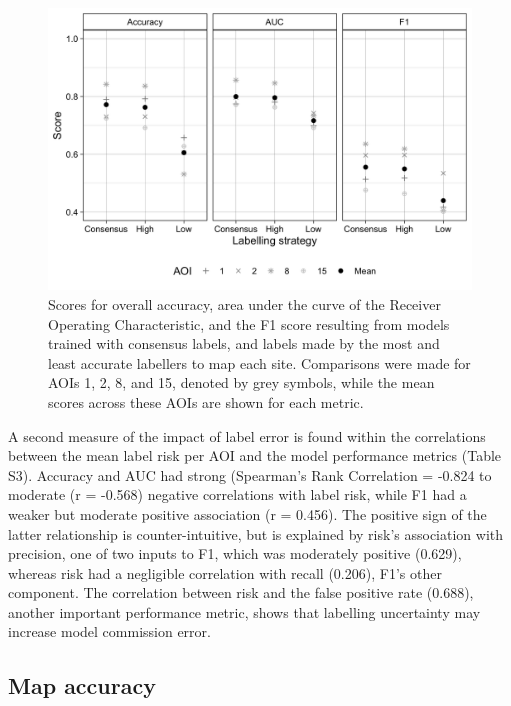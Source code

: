 \documentclass[11pt,a4paper]{article}
\begin{document}
\begin{figure}

{\centering \includegraphics[width=1\linewidth]{figures/figure6} 

}

\caption{Scores for overall accuracy, area under the curve of the Receiver Operating Characteristic, and the F1 score resulting from models trained with consensus labels, and labels made by the most and least accurate labellers to map each site. Comparisons were made for AOIs 1, 2, 8, and 15, denoted by grey symbols, while the mean scores across these AOIs are shown for each metric.}\label{fig:trainingimpact}
\end{figure}

A second measure of the impact of label error is found within the
correlations between the mean label risk per AOI and the model
performance metrics (Table S3). Accuracy and AUC had strong (Spearman's
Rank Correlation = -0.824 to moderate (r = -0.568) negative correlations
with label risk, while F1 had a weaker but moderate positive association
(r = 0.456). The positive sign of the latter relationship is
counter-intuitive, but is explained by risk's association with
precision, one of two inputs to F1, which was moderately positive
(0.629), whereas risk had a negligible correlation with recall (0.206),
F1's other component. The correlation between risk and the false
positive rate (0.688), another important performance metric, shows that
labelling uncertainty may increase model commission error.

\hypertarget{map-accuracy}{%
\subsection{Map accuracy}\label{map-accuracy}}
\end{document}
